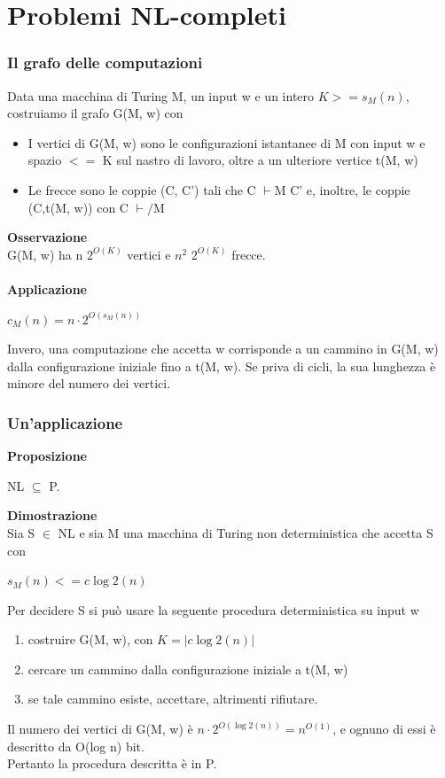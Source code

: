\chapter{Problemi NL-completi} \label{ch:capitolo17}
\subsection{Il grafo delle computazioni}
Data una macchina di Turing M, un input w e un intero $K >= s_M(n)$, costruiamo il grafo G(M, w) con
\begin{itemize}
    \item I vertici di G(M, w) sono le configurazioni istantanee di M con input w e spazio $<=$ K sul nastro di lavoro, oltre a un ulteriore vertice t(M, w)
    \item Le frecce sono le coppie (C, C') tali che C $\vdash$M C' e, inoltre, le coppie (C,t(M, w)) con C $\vdash /$M
\end{itemize}
\textbf{Osservazione}\\
G(M, w) ha n $2^{O(K)}$ vertici e $n^2$ $2^{O(K)}$ frecce.\\\\
\textbf{Applicazione}\\
\begin{center}
    $c_M(n) = n · 2^{O(s_M(n))}$
\end{center}
Invero, una computazione che accetta w corrisponde a un cammino in G(M, w) dalla configurazione iniziale fino a t(M, w).
Se priva di cicli, la sua lunghezza è minore del numero dei vertici.
\subsection{Un'applicazione}
\textbf{Proposizione}\\
\begin{center}
    NL $\subseteq$ P.
\end{center}
\textbf{Dimostrazione}\\
Sia S $\in$ NL e sia M una macchina di Turing non deterministica che accetta S con
\begin{center}
    $s_M(n) <= c \log2(n)$
\end{center}
Per decidere S si può usare la seguente procedura deterministica su input w
\begin{enumerate}
    \item costruire G(M, w), con $K = |c \log2(n)|$
    \item cercare un cammino dalla configurazione iniziale a t(M, w)
    \item se tale cammino esiste, accettare, altrimenti rifiutare.
\end{enumerate}
Il numero dei vertici di G(M, w) è $n · 2^{O(\log2(n))} = n^{O(1)}$, e ognuno di essi è descritto da O(log n) bit.
\\Pertanto la procedura descritta è in P.
